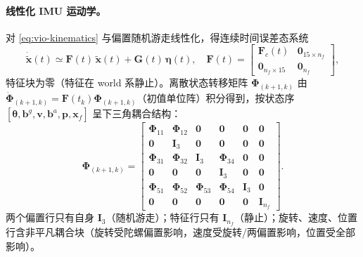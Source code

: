 \paragraph{线性化 IMU 运动学。}
对 \cref{eq:vio-kinematics} 与偏置随机游走线性化，得连续时间误差态系统
\begin{equation}
  \dot{\tilde{\boldsymbol{x}}}(t)\simeq\mathbf{F}(t)\,\tilde{\boldsymbol{x}}(t)+\mathbf{G}(t)\,\boldsymbol{\eta}(t),
  \quad
  \mathbf{F}(t)=\begin{bmatrix}\mathbf{F}_c(t)&\mathbf{0}_{15\times n_f}\\ \mathbf{0}_{n_f\times15}&\mathbf{0}_{n_f}\end{bmatrix},
  \label{eq:vio-err-dyn}
\end{equation}
特征块为零（特征在 world 系静止）。离散状态转移矩阵 $\boldsymbol{\Phi}_{(k+1,k)}$ 由 $\dot{\boldsymbol{\Phi}}_{(k+1,k)}=\mathbf{F}(t_k)\boldsymbol{\Phi}_{(k+1,k)}$（初值单位阵）积分得到，按状态序 $[\boldsymbol{\theta},\mathbf{b}^g,\mathbf{v},\mathbf{b}^a,\mathbf{p},\boldsymbol{x}_f]$ 呈下三角耦合结构：
\begin{equation}
  \boldsymbol{\Phi}_{(k+1,k)}=\begin{bmatrix}
  \boldsymbol{\Phi}_{11}&\boldsymbol{\Phi}_{12}&\mathbf{0}&\mathbf{0}&\mathbf{0}&\mathbf{0}\\
  \mathbf{0}&\mathbf{I}_3&\mathbf{0}&\mathbf{0}&\mathbf{0}&\mathbf{0}\\
  \boldsymbol{\Phi}_{31}&\boldsymbol{\Phi}_{32}&\mathbf{I}_3&\boldsymbol{\Phi}_{34}&\mathbf{0}&\mathbf{0}\\
  \mathbf{0}&\mathbf{0}&\mathbf{0}&\mathbf{I}_3&\mathbf{0}&\mathbf{0}\\
  \boldsymbol{\Phi}_{51}&\boldsymbol{\Phi}_{52}&\boldsymbol{\Phi}_{53}&\boldsymbol{\Phi}_{54}&\mathbf{I}_3&\mathbf{0}\\
  \mathbf{0}&\mathbf{0}&\mathbf{0}&\mathbf{0}&\mathbf{0}&\mathbf{I}_{n_f}
  \end{bmatrix}.
  \label{eq:vio-Phi}
\end{equation}
两个偏置行只有自身 $\mathbf{I}_3$（随机游走）；特征行只有 $\mathbf{I}_{n_f}$（静止）；旋转、速度、位置行含非平凡耦合块（旋转受陀螺偏置影响，速度受旋转/两偏置影响，位置受全部影响）。

